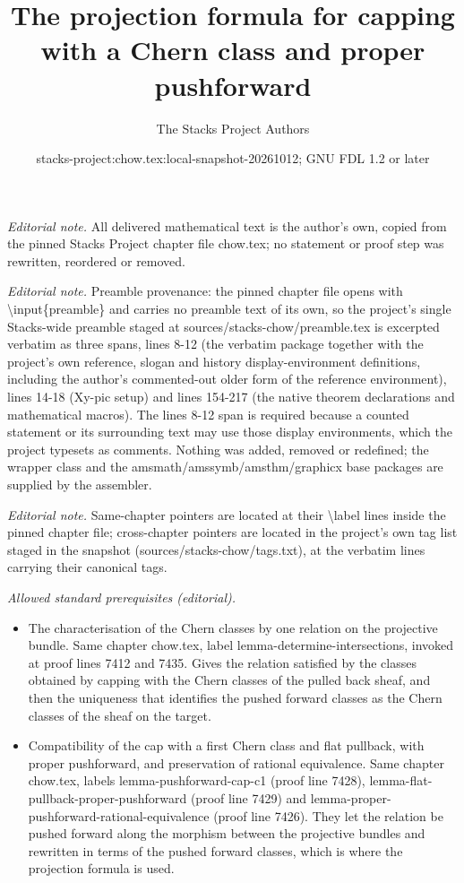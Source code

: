 \documentclass[10pt,a4paper]{amsart}
\title{The projection formula for capping with a Chern class and proper pushforward}
\author{The Stacks Project Authors}
\date{stacks-project:chow.tex:local-snapshot-20261012; GNU FDL 1.2 or later}
\theoremstyle{plain}
\theoremstyle{definition}
\theoremstyle{remark}
\numberwithin{equation}{subsection}
\begin{document}
\maketitle
\noindent\textit{Editorial note.} All delivered mathematical text is the author's own, copied from the pinned Stacks Project chapter file chow.tex; no statement or proof step was rewritten, reordered or removed.\par\medskip
\noindent\textit{Editorial note.} Preamble provenance: the pinned chapter file opens with \textbackslash{}input\{preamble\} and carries no preamble text of its own, so the project's single Stacks-wide preamble staged at sources/stacks-chow/preamble.tex is excerpted verbatim as three spans, lines 8-12 (the verbatim package together with the project's own reference, slogan and history display-environment definitions, including the author's commented-out older form of the reference environment), lines 14-18 (Xy-pic setup) and lines 154-217 (the native theorem declarations and mathematical macros). The lines 8-12 span is required because a counted statement or its surrounding text may use those display environments, which the project typesets as comments. Nothing was added, removed or redefined; the wrapper class and the amsmath/amssymb/amsthm/graphicx base packages are supplied by the assembler.\par\medskip
\noindent\textit{Editorial note.} Same-chapter pointers are located at their \textbackslash{}label lines inside the pinned chapter file; cross-chapter pointers are located in the project's own tag list staged in the snapshot (sources/stacks-chow/tags.txt), at the verbatim lines carrying their canonical tags.\par\medskip
\noindent\textit{Allowed standard prerequisites (editorial).}\begin{itemize}
\item The characterisation of the Chern classes by one relation on the projective bundle. Same chapter chow.tex, label lemma-determine-intersections, invoked at proof lines 7412 and 7435. Gives the relation satisfied by the classes obtained by capping with the Chern classes of the pulled back sheaf, and then the uniqueness that identifies the pushed forward classes as the Chern classes of the sheaf on the target.
\item Compatibility of the cap with a first Chern class and flat pullback, with proper pushforward, and preservation of rational equivalence. Same chapter chow.tex, labels lemma-pushforward-cap-c1 (proof line 7428), lemma-flat-pullback-proper-pushforward (proof line 7429) and lemma-proper-pushforward-rational-equivalence (proof line 7426). They let the relation be pushed forward along the morphism between the projective bundles and rewritten in terms of the pushed forward classes, which is where the projection formula is used.
\end{itemize}\medskip
\end{document}
